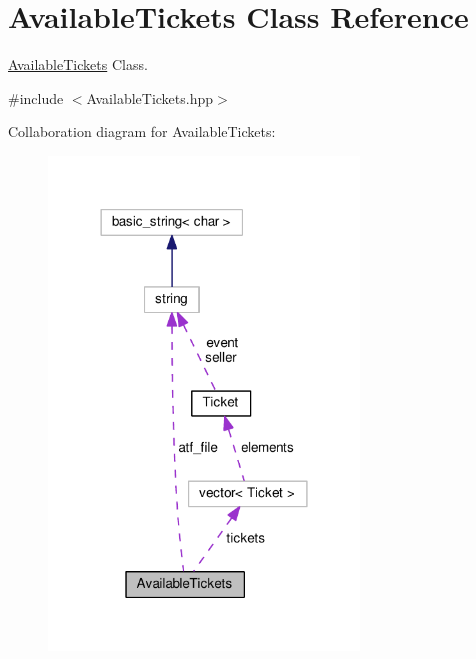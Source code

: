 \hypertarget{class_available_tickets}{\section{Available\-Tickets Class Reference}
\label{class_available_tickets}
}


\hyperlink{class_available_tickets}{Available\-Tickets} Class.  




{\ttfamily \#include $<$Available\-Tickets.\-hpp$>$}



Collaboration diagram for Available\-Tickets\-:
\nopagebreak
\begin{figure}[H]
\begin{center}
\leavevmode
\includegraphics[width=234pt]{class_available_tickets__coll__graph}
\end{center}
\end{figure}
